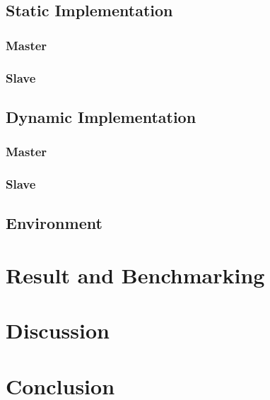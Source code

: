 \documentclass[11pt,conference]{IEEEtran}
\begin{document}
\subsection{Static Implementation}
\subsubsection{\textbf{Master}}
\subsubsection{\textbf{Slave}}
\subsection{Dynamic Implementation}
\subsubsection{\textbf{Master}}
\subsubsection{\textbf{Slave}}
\subsection{Environment}
\section{Result and Benchmarking}
\section{Discussion}

\section{Conclusion}



\end{document}
